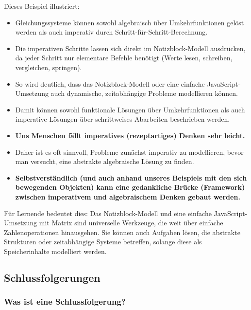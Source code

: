 \documentclass{article}
\begin{document}
        
Dieses Beispiel illustriert:

        \begin{itemize}
          \item Gleichungssysteme können sowohl algebraisch über Umkehrfunktionen gelöst werden als auch imperativ durch Schritt-für-Schritt-Berechnung.

          \item Die imperativen Schritte lassen sich direkt im Notizblock-Modell ausdrücken, da jeder Schritt nur elementare Befehle benötigt (Werte lesen, schreiben, vergleichen, springen).

          \item So wird deutlich, dass das Notizblock-Modell oder eine einfache JavaScript-Umsetzung auch dynamische, zeitabhängige Probleme modellieren können.

          \item Damit können sowohl funktionale Lösungen über Umkehrfunktionen als auch imperative Lösungen über schrittweises Abarbeiten beschrieben werden.

          \item \textbf{Uns Menschen fällt imperatives (rezeptartiges) Denken sehr leicht.}

          \item Daher ist es oft sinnvoll, Probleme zunächst imperativ zu modellieren, bevor man versucht, eine abstrakte algebraische Lösung zu finden.

          \item \textbf{Selbstverständlich (und auch anhand unseres Beispiels mit den sich bewegenden Objekten) kann eine gedankliche Brücke (Framework) zwischen imperativem und algebraischem Denken gebaut werden.}

        \end{itemize}

        
Für Lernende bedeutet dies: Das Notizblock-Modell und eine einfache JavaScript-Umsetzung mit Matrix sind universelle Werkzeuge, die weit über einfache Zahlenoperationen hinausgehen. Sie können auch Aufgaben lösen, die abstrakte Strukturen oder zeitabhängige Systeme betreffen, solange diese als Speicherinhalte modelliert werden.    

  
    \subsection{Schlussfolgerungen}
  
    \subsubsection{Was ist eine Schlussfolgerung?}
    
\end{document}
